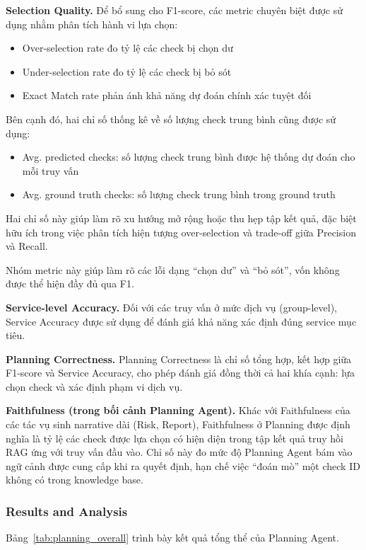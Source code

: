 \textbf{Selection Quality.}
Để bổ sung cho F1-score, các metric chuyên biệt được sử dụng nhằm phân tích hành vi lựa chọn:
\begin{itemize}
    \item Over-selection rate đo tỷ lệ các check bị chọn dư
    \item Under-selection rate đo tỷ lệ các check bị bỏ sót
    \item Exact Match rate phản ánh khả năng dự đoán chính xác tuyệt đối
\end{itemize}
Bên cạnh đó, hai chỉ số thống kê về số lượng check trung bình cũng được sử dụng:
\begin{itemize}
    \item Avg. predicted checks: số lượng check trung bình được hệ thống dự đoán cho mỗi truy vấn
    \item Avg. ground truth checks: số lượng check trung bình trong ground truth
\end{itemize}
Hai chỉ số này giúp làm rõ xu hướng mở rộng hoặc thu hẹp tập kết quả, đặc biệt hữu ích trong việc phân tích hiện tượng over-selection và trade-off giữa Precision và Recall.

Nhóm metric này giúp làm rõ các lỗi dạng ``chọn dư'' và ``bỏ sót'', vốn không được thể hiện đầy đủ qua F1.

\textbf{Service-level Accuracy.}
Đối với các truy vấn ở mức dịch vụ (group-level), Service Accuracy được sử dụng để đánh giá khả năng xác định đúng service mục tiêu.

\textbf{Planning Correctness.}
Planning Correctness là chỉ số tổng hợp, kết hợp giữa F1-score và Service Accuracy, cho phép đánh giá đồng thời cả hai khía cạnh: lựa chọn check và xác định phạm vi dịch vụ.

\textbf{Faithfulness (trong bối cảnh Planning Agent).} Khác với Faithfulness của các tác vụ sinh narrative dài (Risk, Report), Faithfulness ở Planning được định nghĩa là tỷ lệ các check được lựa chọn có hiện diện trong tập kết quả truy hồi RAG ứng với truy vấn đầu vào. Chỉ số này đo mức độ Planning Agent bám vào ngữ cảnh được cung cấp khi ra quyết định, hạn chế việc ``đoán mò'' một check ID không có trong knowledge base.

\subsubsection*{Results and Analysis}

Bảng~\ref{tab:planning_overall} trình bày kết quả tổng thể của Planning Agent.

